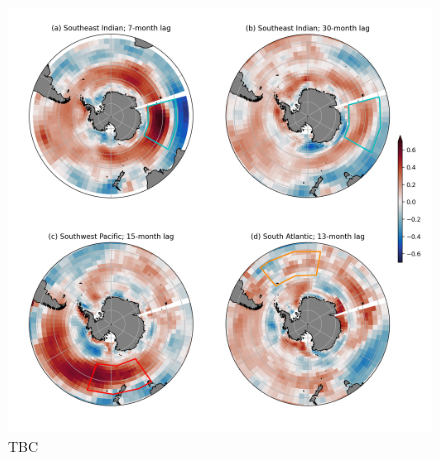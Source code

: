\documentclass{agujournal2019}
\begin{document}
\begin{figure}[t]
\begin{center}
\includegraphics[width=\hsize]{Figure5}
\caption{ TBC}
\label{Fig:5}
\end{center}
\end{figure}
\end{document}

